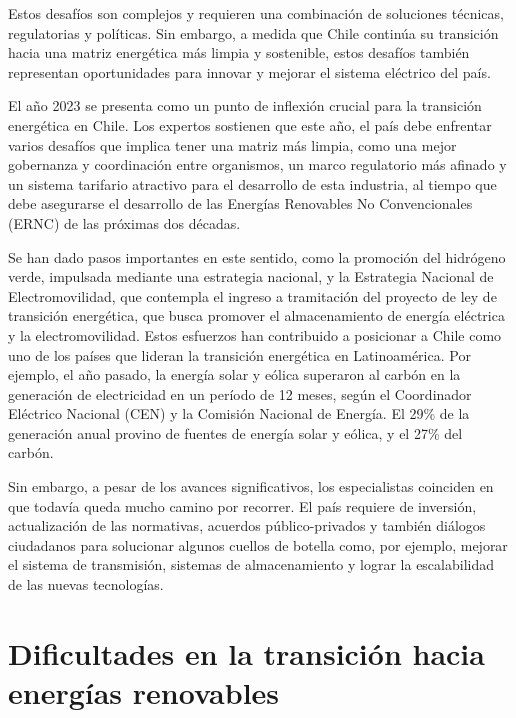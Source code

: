 Estos desafíos son complejos y requieren una combinación de soluciones técnicas, regulatorias y políticas. Sin embargo, a medida que Chile continúa su transición hacia una matriz energética más limpia y sostenible, estos desafíos también representan oportunidades para innovar y mejorar el sistema eléctrico del país.\vspace{2.5mm}

El año 2023 se presenta como un punto de inflexión crucial para la transición energética en Chile. Los expertos sostienen que este año, el país debe enfrentar varios desafíos que implica tener una matriz más limpia, como una mejor gobernanza y coordinación entre organismos, un marco regulatorio más afinado y un sistema tarifario atractivo para el desarrollo de esta industria, al tiempo que debe asegurarse el desarrollo de las Energías Renovables No Convencionales (ERNC) de las próximas dos décadas.\vspace{2.5mm}

Se han dado pasos importantes en este sentido, como la promoción del hidrógeno verde, impulsada mediante una estrategia nacional, y la Estrategia Nacional de Electromovilidad, que contempla el ingreso a tramitación del proyecto de ley de transición energética, que busca promover el almacenamiento de energía eléctrica y la electromovilidad. Estos esfuerzos han contribuido a posicionar a Chile como uno de los países que lideran la transición energética en Latinoamérica. Por ejemplo, el año pasado, la energía solar y eólica superaron al carbón en la generación de electricidad en un período de 12 meses, según el Coordinador Eléctrico Nacional (CEN) y la Comisión Nacional de Energía. El 29\% de la generación anual provino de fuentes de energía solar y eólica, y el 27\% del carbón.\vspace{2.5mm}

Sin embargo, a pesar de los avances significativos, los especialistas coinciden en que todavía queda mucho camino por recorrer. El país requiere de inversión, actualización de las normativas, acuerdos público-privados y también diálogos ciudadanos para solucionar algunos cuellos de botella como, por ejemplo, mejorar el sistema de transmisión, sistemas de almacenamiento y lograr la escalabilidad de las nuevas tecnologías.

\section{Dificultades en la transición hacia energías renovables}\label{c22}

